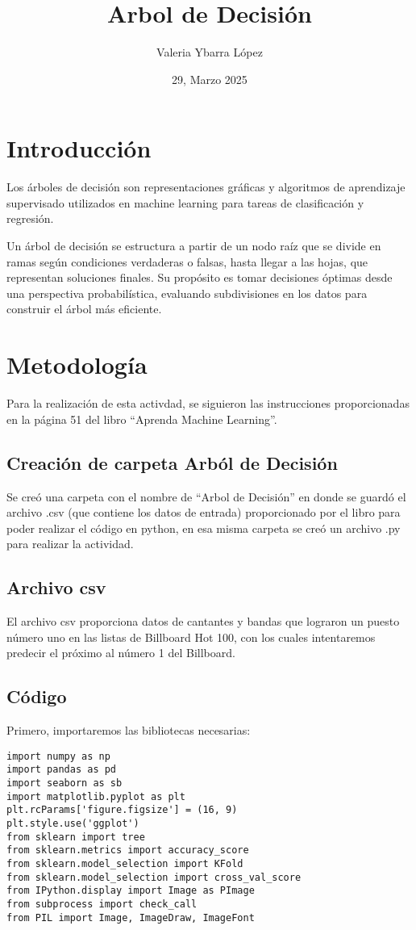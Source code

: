 \documentclass{article}
\title{Arbol de Decisión}
\author{Valeria Ybarra López}
\date{29, Marzo 2025}
\begin{document}
\maketitle

\section{Introducción}


Los árboles de decisión son representaciones gráficas y algoritmos de aprendizaje supervisado utilizados en machine learning para tareas de clasificación y regresión. 


Un árbol de decisión se estructura a partir de un nodo raíz que se divide en ramas según condiciones verdaderas o falsas, hasta llegar a las hojas, que representan soluciones finales.
Su propósito es tomar decisiones óptimas desde una perspectiva probabilística, evaluando subdivisiones en los datos para construir el árbol más eficiente.


\section{Metodología}

Para la realización de esta activdad, se siguieron las instrucciones proporcionadas en la página 51 del libro ``Aprenda Machine Learning''.
\subsection{Creación de carpeta Arból de Decisión}

Se creó una carpeta con el nombre de ``Arbol de Decisión'' en donde se guardó el archivo .csv (que contiene los datos de entrada) proporcionado por el libro para poder realizar el código en python, en esa misma carpeta se creó un archivo .py para realizar la actividad.

\subsection{Archivo csv}
El archivo csv proporciona datos de cantantes y bandas que lograron un puesto número uno en las listas de Billboard Hot 100, con los cuales intentaremos predecir el próximo al número 1 del Billboard.

\subsection{Código}
Primero, importaremos las bibliotecas necesarias: 
\begin{lstlisting}
import numpy as np
import pandas as pd
import seaborn as sb
import matplotlib.pyplot as plt
plt.rcParams['figure.figsize'] = (16, 9)
plt.style.use('ggplot')
from sklearn import tree
from sklearn.metrics import accuracy_score
from sklearn.model_selection import KFold
from sklearn.model_selection import cross_val_score
from IPython.display import Image as PImage
from subprocess import check_call
from PIL import Image, ImageDraw, ImageFont
\end{lstlisting}
\end{document}
